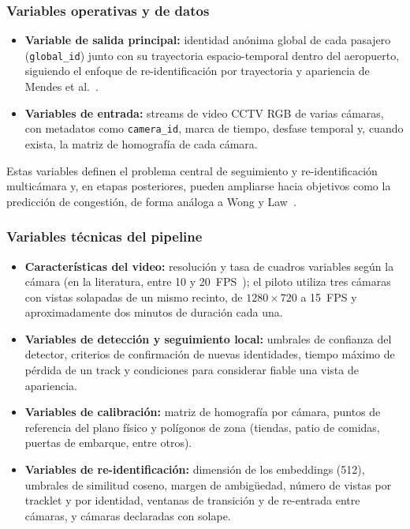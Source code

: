 \documentclass[12pt,letterpaper]{article}
\begin{document}
\subsubsection{Variables operativas y de datos}
\begin{itemize}
    \item \textbf{Variable de salida principal:} identidad anónima global
    de cada pasajero (\texttt{global\_id}) junto con su trayectoria
    espacio-temporal dentro del aeropuerto, siguiendo el enfoque de
    re-identificación por trayectoria y apariencia de Mendes et
    al.~\cite{mendes2023}.
    \item \textbf{Variables de entrada:} streams de video CCTV RGB de
    varias cámaras, con metadatos como \texttt{camera\_id}, marca de
    tiempo, desfase temporal y, cuando exista, la matriz de homografía de
    cada cámara.
\end{itemize}
Estas variables definen el problema central de seguimiento y
re-identificación multicámara y, en etapas posteriores, pueden ampliarse
hacia objetivos como la predicción de congestión, de forma análoga a Wong
y Law~\cite{wonglaw2023}.

\subsubsection{Variables técnicas del pipeline}
\begin{itemize}
    \item \textbf{Características del video:} resolución y tasa de
    cuadros variables según la cámara (en la literatura, entre 10 y
    20~FPS~\cite{mendes2023,zhao2023}); el piloto utiliza tres cámaras
    con vistas solapadas de un mismo recinto, de $1280\times720$ a
    15~FPS y aproximadamente dos minutos de duración cada una.
    \item \textbf{Variables de detección y seguimiento local:} umbrales
    de confianza del detector, criterios de confirmación de nuevas
    identidades, tiempo máximo de pérdida de un track y condiciones para
    considerar fiable una vista de apariencia.
    \item \textbf{Variables de calibración:} matriz de homografía por
    cámara, puntos de referencia del plano físico y polígonos de zona
    (tiendas, patio de comidas, puertas de embarque, entre otros).
    \item \textbf{Variables de re-identificación:} dimensión de los
    embeddings (512), umbrales de similitud coseno, margen de
    ambigüedad, número de vistas por tracklet y por identidad, ventanas
    de transición y de re-entrada entre cámaras, y cámaras declaradas
    con solape.
\end{itemize}
\end{document}
